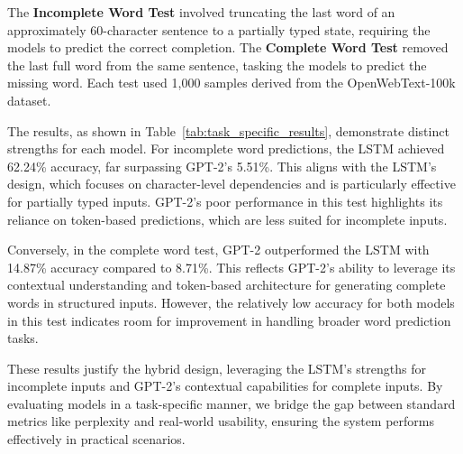 The \textbf{Incomplete Word Test} involved truncating the last word of an approximately 60-character sentence to a partially typed state,
requiring the models to predict the correct completion.
The \textbf{Complete Word Test} removed the last full word from the same sentence, tasking the models to predict the missing word.
Each test used 1,000 samples derived from the OpenWebText-100k dataset.

The results, as shown in Table~\ref{tab:task_specific_results}, demonstrate distinct strengths for each model.
For incomplete word predictions, the LSTM achieved 62.24\% accuracy, far surpassing GPT-2's 5.51\%.
This aligns with the LSTM's design, which focuses on character-level dependencies and is particularly effective for partially typed inputs.
GPT-2's poor performance in this test highlights its reliance on token-based predictions, which are less suited for incomplete inputs.

Conversely, in the complete word test, GPT-2 outperformed the LSTM with 14.87\% accuracy compared to 8.71\%.
This reflects GPT-2's ability to leverage its contextual understanding and token-based architecture for generating complete words in structured inputs.
However, the relatively low accuracy for both models in this test indicates room for improvement in handling broader word prediction tasks.

These results justify the hybrid design, leveraging the LSTM's strengths for incomplete inputs and GPT-2's contextual capabilities for complete inputs.
By evaluating models in a task-specific manner, we bridge the gap between standard metrics like perplexity and real-world usability,
ensuring the system performs effectively in practical scenarios.
